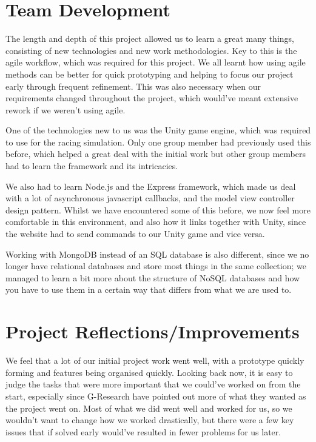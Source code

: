 \section{Team Development}

The length and depth of this project allowed us to learn a great many things,
consisting of new technologies and new work methodologies. Key to this is the
agile workflow, which was required for this project. We all learnt how using
agile methods can be better for quick prototyping and helping to focus our
project early through frequent refinement. This was also necessary when our
requirements changed throughout the project, which would've meant extensive
rework if we weren't using agile.

One of the technologies new to us was the Unity game engine, which was required
to use for the racing simulation. Only one group member had previously used this
before, which helped a great deal with the initial work but other group members
had to learn the framework and its intricacies. 

We also had to learn Node.js and the Express framework, which made us deal with
a lot of asynchronous javascript callbacks, and the model view controller design
pattern. Whilst we have encountered some of this before, we now feel more
comfortable in this environment, and also how it links together with Unity,
since the website had to send commands to our Unity game and vice versa.

Working with MongoDB instead of an SQL database is also different, since we no
longer have relational databases and store most things in the same collection;
we managed to learn a bit more about the structure of NoSQL databases and how
you have to use them in a certain way that differs from what we are used to.

\section{Project Reflections/Improvements}

We feel that a lot of our initial project work went well, with a prototype
quickly forming and features being organised quickly. Looking back now, it is
easy to judge the tasks that were more important that we could've worked on from
the start, especially since G-Research have pointed out more of what they wanted
as the project went on. Most of what we did went well and worked for us, so we
wouldn't want to change how we worked drastically, but there were a few key
issues that if solved early would've resulted in fewer problems for us later.

